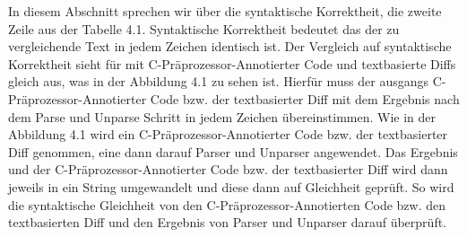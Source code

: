 In diesem Abschnitt sprechen wir über die syntaktische Korrektheit, die zweite Zeile aus der Tabelle 4.1. Syntaktische Korrektheit bedeutet das der zu vergleichende Text in jedem Zeichen identisch ist. Der Vergleich auf syntaktische Korrektheit sieht für mit C-Präprozessor-Annotierter Code und textbasierte Diffs gleich aus, was in der Abbildung 4.1 zu sehen ist. Hierfür muss der ausgangs C-Präprozessor-Annotierter Code bzw. der textbasierter Diff  mit dem Ergebnis nach dem Parse und Unparse Schritt in jedem Zeichen übereinstimmen. Wie in der Abbildung 4.1 wird ein C-Präprozessor-Annotierter Code bzw. der textbasierter Diff genommen, eine dann darauf Parser und Unparser angewendet. Das Ergebnis und der C-Präprozessor-Annotierter Code bzw. der textbasierter Diff wird dann jeweils in ein String umgewandelt und diese dann auf Gleichheit geprüft. So wird die syntaktische Gleichheit von den C-Präprozessor-Annotierten Code bzw. den textbasierten Diff und den Ergebnis von Parser und Unparser darauf überprüft.

